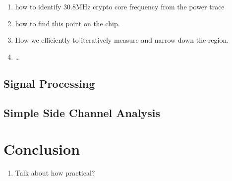 \documentclass{llncs}
\begin{document}
\begin{enumerate}
  \item how to identify 30.8MHz crypto core frequency from the power trace
  \item how to find this point on the chip. 
  \item How we efficiently to iteratively measure and narrow down the region.
  \item \ldots
\end{enumerate}


\subsection{Signal Processing}




\subsection{Simple Side Channel Analysis}




\section{Conclusion}

\begin{enumerate}
  \item Talk about how practical?
\end{enumerate}




% 
% 
% 
% 
\end{document}
